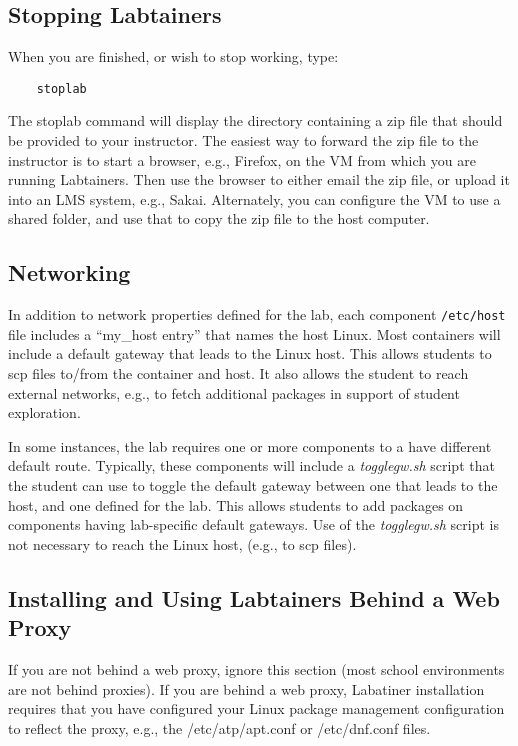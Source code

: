 \documentclass[12pt]{article}
\begin{document}
\subsection{Stopping Labtainers}
When you are finished, or wish to stop working, type:
\begin{verbatim}
    stoplab
\end{verbatim}
\noindent The stoplab command will display the directory containing a zip file that should be provided to your instructor.
The easiest way to forward the zip file to the instructor is to start a browser, e.g., Firefox, on the VM from which you
are running Labtainers.  Then use the browser to either email the zip file, or upload it into an LMS system, e.g., Sakai.
Alternately, you can configure the VM to use a shared folder, and use that to copy the zip file to the host computer.

\subsection{Networking}
In addition to network properties defined for the lab,
each component \texttt{/etc/host} file includes a ``my\_host entry'' that names
the host Linux.  Most containers will include a default gateway that
leads to the Linux host.  This allows students to scp files to/from the container and host.
It also allows the student to reach external networks, e.g., to fetch additional packages in
support of student exploration.

In some instances, the lab requires one or more components to a have different default route.
Typically, these components will include a \textit{togglegw.sh} script that the student
can use to toggle the default gateway between one that leads to the host, and one defined for the lab.
This allows students to add packages on components having lab-specific default gateways.
Use of the \textit{togglegw.sh} script is not necessary to reach the Linux host, (e.g., to scp files).

\subsection{Installing and Using Labtainers Behind a Web Proxy}
If you are not behind a web proxy, ignore this section (most school environments
are not behind proxies). 
If you are behind a web proxy, Labatiner installation
requires that you have configured your Linux package management configuration to reflect
the proxy, e.g., the /etc/atp/apt.conf or /etc/dnf.conf files.  
\end{document}
